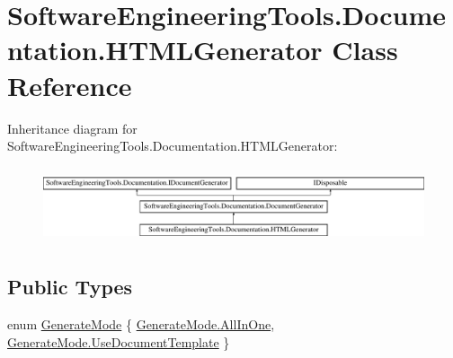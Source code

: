\hypertarget{class_software_engineering_tools_1_1_documentation_1_1_h_t_m_l_generator}{\section{Software\+Engineering\+Tools.\+Documentation.\+H\+T\+M\+L\+Generator Class Reference}
\label{class_software_engineering_tools_1_1_documentation_1_1_h_t_m_l_generator}
}
Inheritance diagram for Software\+Engineering\+Tools.\+Documentation.\+H\+T\+M\+L\+Generator\+:\begin{figure}[H]
\begin{center}
\leavevmode
\includegraphics[height=2.240000cm]{class_software_engineering_tools_1_1_documentation_1_1_h_t_m_l_generator}
\end{center}
\end{figure}
\subsection*{Public Types}
\begin{DoxyCompactItemize}
\item 
enum \hyperlink{class_software_engineering_tools_1_1_documentation_1_1_h_t_m_l_generator_a86814d784071578546b204de6e0bbf11}{Generate\+Mode} \{ \hyperlink{class_software_engineering_tools_1_1_documentation_1_1_h_t_m_l_generator_a86814d784071578546b204de6e0bbf11ad02f4a49036838ab477b993dd40479c5}{Generate\+Mode.\+All\+In\+One}, 
\hyperlink{class_software_engineering_tools_1_1_documentation_1_1_h_t_m_l_generator_a86814d784071578546b204de6e0bbf11a7a23203142435810e9f3ce22141f44fc}{Generate\+Mode.\+Use\+Document\+Template}
 \}
\end{DoxyCompactItemize}
